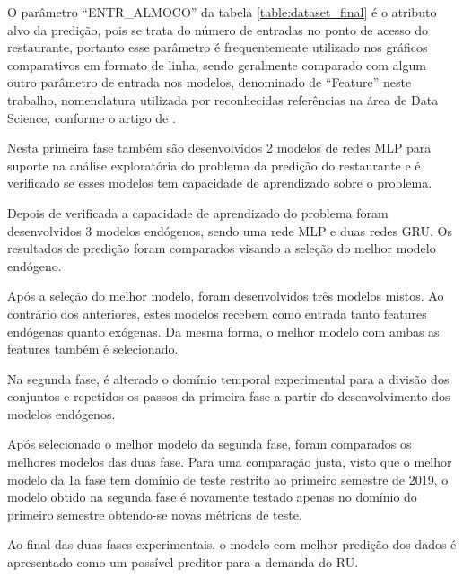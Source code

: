 \documentclass[	12pt, Times, openright, twoside, a4paper, english, brazil]{abntex2}
\begin{document}
    O parâmetro ``ENTR\_ALMOCO'' da tabela \ref{table:dataset_final} é o atributo alvo da predição, pois se trata do número de entradas no ponto de acesso do restaurante, portanto esse parâmetro é frequentemente utilizado nos gráficos comparativos em formato de linha, sendo geralmente comparado com algum outro parâmetro de entrada nos modelos, denominado de ``Feature'' neste trabalho, nomenclatura utilizada por reconhecidas referências na área de Data Science, conforme o artigo de \cite{TWDSFeatures}.
    
    Nesta primeira fase também são desenvolvidos 2 modelos de redes MLP para suporte na análise exploratória do problema da predição do restaurante e é verificado se esses modelos tem capacidade de aprendizado sobre o problema.
    
    Depois de verificada a capacidade de aprendizado do problema foram desenvolvidos 3 modelos endógenos, sendo uma rede MLP e duas redes GRU. Os resultados de predição foram comparados visando a seleção do melhor modelo endógeno.
    
    Após a seleção do melhor modelo, foram desenvolvidos três modelos mistos. Ao contrário dos anteriores, estes modelos recebem como entrada tanto features endógenas quanto exógenas. Da mesma forma, o melhor modelo com ambas as features também é selecionado.
    
    
    Na segunda fase, é alterado o domínio temporal experimental para a divisão dos conjuntos e repetidos os passos da primeira fase a partir do desenvolvimento dos modelos endógenos.
    
    Após selecionado o melhor modelo da segunda fase, foram comparados os melhores modelos das duas fase. Para uma comparação justa, visto que o melhor modelo da 1a fase tem domínio de teste restrito ao primeiro semestre de 2019, o modelo obtido na segunda fase é novamente testado apenas no domínio do primeiro semestre obtendo-se novas métricas de teste.
    
    
    Ao final das duas fases experimentais, o modelo com melhor predição dos dados é apresentado como um possível preditor para a demanda do RU.
     
\end{document}
